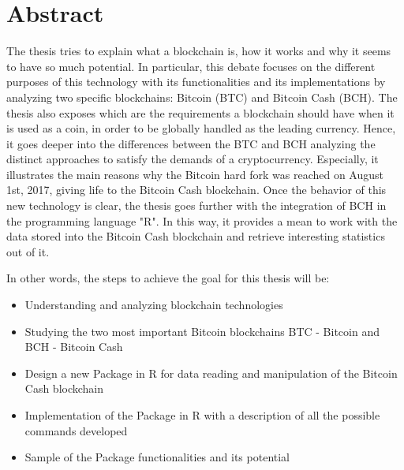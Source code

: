 \chapter*{Abstract} %
\label{abstract}


The thesis tries to explain what a blockchain is, 
how it works and why it seems to have so much potential. 
In particular, this debate focuses on the different purposes of this
technology with its functionalities and its implementations by 
analyzing two specific blockchains: Bitcoin (BTC) and Bitcoin Cash (BCH). 
The thesis also exposes which are the requirements 
a blockchain should have when it is used as a coin, in order to be 
globally handled as the leading currency. Hence, it goes deeper into the
differences between the BTC and BCH analyzing the distinct approaches to 
satisfy the demands of a cryptocurrency. Especially, it illustrates
the main reasons why the Bitcoin hard fork was reached on August 1st, 
2017, giving life to the Bitcoin Cash blockchain.
Once the behavior of this new technology is clear, the thesis goes 
further with the integration of BCH in the programming language "R".
In this way, it provides a mean to work with the data stored into the Bitcoin
Cash blockchain and retrieve interesting statistics out of it.

  In other words, the steps to achieve the goal for this thesis will be:



\begin{itemize}
  \item Understanding and analyzing blockchain technologies
  \item Studying the two most important Bitcoin blockchains BTC - Bitcoin and BCH - Bitcoin Cash
  \item Design a new Package in R for data reading and manipulation of the Bitcoin Cash blockchain  
  \item Implementation of the Package in R with a description of all the possible commands developed 
  \item Sample of the Package functionalities and its potential
\end{itemize}




